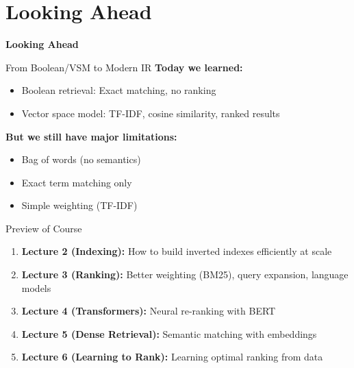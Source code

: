 \documentclass[aspectratio=169]{beamer}
\newif\ifanimated
\newcommand{\cpause}{\ifanimated\pause\fi}
\begin{document}
\section{Looking Ahead}
\begin{frame}
  \centering
  \LARGE \textbf{Looking Ahead}
\end{frame}


\begin{frame}[shrink=15]{From Boolean/VSM to Modern IR}
\textbf{Today we learned:}
\begin{itemize}
    \item Boolean retrieval: Exact matching, no ranking
    \item Vector space model: TF-IDF, cosine similarity, ranked results
\end{itemize}
\cpause
\vspace{1em}

\textbf{But we still have major limitations:}
\begin{itemize}
    \item Bag of words (no semantics)
    \item Exact term matching only
    \item Simple weighting (TF-IDF)
\end{itemize}
\cpause
\vspace{1em}

\begin{block}{Preview of Course}
\begin{enumerate}
    \item \textbf{Lecture 2 (Indexing):} How to build inverted indexes efficiently at scale
    \item \textbf{Lecture 3 (Ranking):} Better weighting (BM25), query expansion, language models
    \item \textbf{Lecture 4 (Transformers):} Neural re-ranking with BERT
    \item \textbf{Lecture 5 (Dense Retrieval):} Semantic matching with embeddings
    \item \textbf{Lecture 6 (Learning to Rank):} Learning optimal ranking from data
\end{enumerate}
\end{block}
\end{frame}
\end{document}
